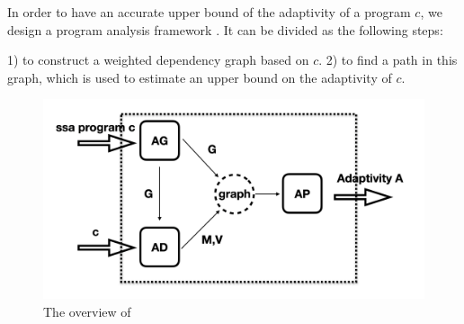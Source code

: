 In order to have an accurate upper bound of the  adaptivity of a program $c$,
we design a program analysis framework {\THESYSTEM}.
It can be divided as the following steps:

1) to construct a weighted dependency graph based on $c$. 2) to find a path in this graph, which is used to estimate an upper bound on the adaptivity of $c$.
\begin{figure}
  \centering    
\includegraphics[width=1.0\columnwidth]{adapfun.png}
  \vspace{-0.3cm}
  \caption{The overview of {\THESYSTEM}}
  \label{fig:adaptfun}
  \vspace{-0.5cm}
\end{figure}

